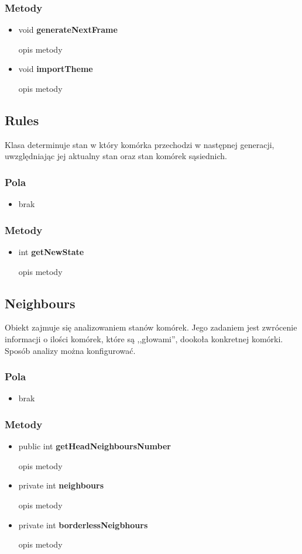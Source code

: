 \documentclass[a4paper,11pt]{article}
\begin{document}
\subsubsection{Metody}
\begin{itemize}
\item void  \textbf{generateNextFrame}

opis metody
\item void  \textbf{importTheme}

opis metody
\end{itemize}

\subsection{Rules}
Klasa determinuje stan w który komórka przechodzi w następnej generacji, uwzględniając jej aktualny stan oraz stan komórek sąsiednich. 

\subsubsection{Pola}
\begin{itemize}
\item brak
\end{itemize}
\subsubsection{Metody}
\begin{itemize}
\item int  \textbf{getNewState}

opis metody
\end{itemize}

\subsection{Neighbours}
Obiekt zajmuje się analizowaniem stanów komórek. Jego zadaniem jest zwrócenie informacji o ilości komórek, które są ,,głowami'', dookoła konkretnej komórki. Sposób analizy można konfigurować.

\subsubsection{Pola}
\begin{itemize}
\item brak
\end{itemize}
\subsubsection{Metody}
\begin{itemize}
\item public int  \textbf{getHeadNeighboursNumber}

opis metody
\item private int  \textbf{neighbours}

opis metody
\item private int  \textbf{borderlessNeigbhours}

opis metody
\end{itemize}
\end{document}
